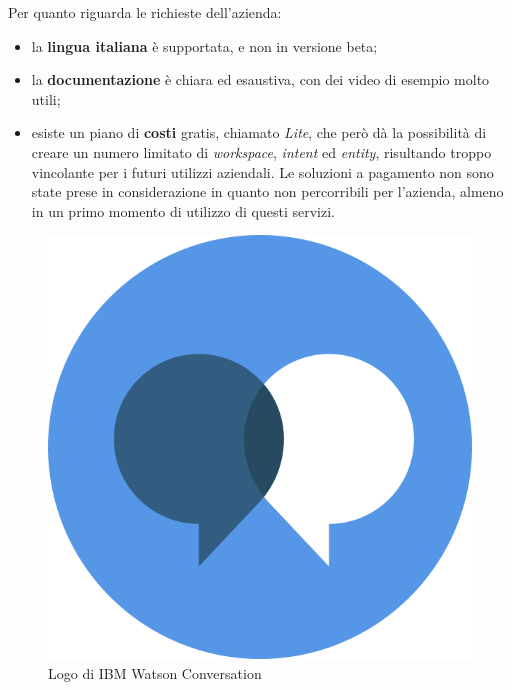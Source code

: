 Per quanto riguarda le richieste dell'azienda:
\begin{itemize}
	\item la \textbf{lingua italiana} è supportata, e non in versione beta;
	\item la \textbf{documentazione} è chiara ed esaustiva, con dei video di esempio molto utili;
	\item esiste un piano di \textbf{costi} gratis, chiamato \emph{Lite}, che però dà la possibilità di creare un numero limitato di \emph{workspace}, \emph{intent} ed \emph{entity}, risultando troppo vincolante per i futuri utilizzi aziendali. Le soluzioni a pagamento non sono state prese in considerazione in quanto non percorribili per l'azienda, almeno in un primo momento di utilizzo di questi servizi.
\end{itemize}

\begin{figure}[h]
	\centering
	\includegraphics[scale=0.1]{../Immagini/watson_conversations_icon.png}
	\caption{Logo di IBM Watson Conversation}
\end{figure}

